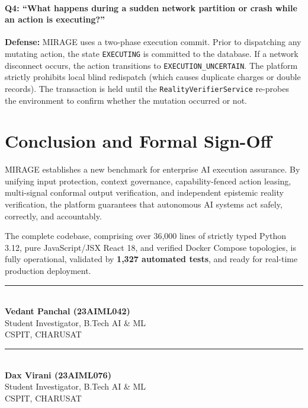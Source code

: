 \documentclass[11pt,a4paper]{article}
\begin{document}
\paragraph{Q4: ``What happens during a sudden network partition or crash while an action is executing?''}
\textbf{Defense:} MIRAGE uses a two-phase execution commit. Prior to dispatching any mutating action, the state \texttt{EXECUTING} is committed to the database. If a network disconnect occurs, the action transitions to \texttt{EXECUTION\_UNCERTAIN}. The platform strictly prohibits local blind redispatch (which causes duplicate charges or double records). The transaction is held until the \texttt{RealityVerifierService} re-probes the environment to confirm whether the mutation occurred or not.

\section{Conclusion and Formal Sign-Off}

MIRAGE establishes a new benchmark for enterprise AI execution assurance. By unifying input protection, context governance, capability-fenced action leasing, multi-signal conformal output verification, and independent epistemic reality verification, the platform guarantees that autonomous AI systems act safely, correctly, and accountably. 

The complete codebase, comprising over 36,000 lines of strictly typed Python 3.12, pure JavaScript/JSX React 18, and verified Docker Compose topologies, is fully operational, validated by \textbf{1,327 automated tests}, and ready for real-time production deployment.

\vspace{1.0cm}
\noindent
\begin{minipage}[t]{0.46\textwidth}
  \rule{\linewidth}{0.6pt}\\
  \textbf{Vedant Panchal (23AIML042)}\\
  Student Investigator, B.Tech AI \& ML\\
  CSPIT, CHARUSAT
\end{minipage}
\hfill
\begin{minipage}[t]{0.46\textwidth}
  \rule{\linewidth}{0.6pt}\\
  \textbf{Dax Virani (23AIML076)}\\
  Student Investigator, B.Tech AI \& ML\\
  CSPIT, CHARUSAT
\end{minipage}
\end{document}
